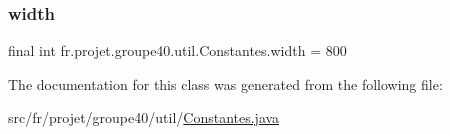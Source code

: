 \subsubsection{\texorpdfstring{width}{width}}
{\footnotesize\ttfamily final int fr.\+projet.\+groupe40.\+util.\+Constantes.\+width = 800\hspace{0.3cm}{\ttfamily [static]}}



The documentation for this class was generated from the following file\+:\begin{DoxyCompactItemize}
\item 
src/fr/projet/groupe40/util/\hyperlink{_constantes_8java}{Constantes.\+java}\end{DoxyCompactItemize}

